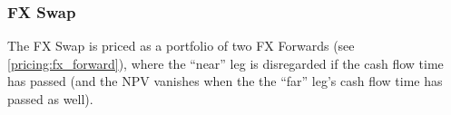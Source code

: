 \subsubsection{FX Swap}
\label{pricing:fx_swap}

The FX Swap is priced as a portfolio of two FX Forwards (see
\ref{pricing:fx_forward}), where the ``near'' leg is 
disregarded if the cash flow time has passed (and the NPV vanishes when the the 
``far'' leg's cash flow time has passed as well).
%
%
